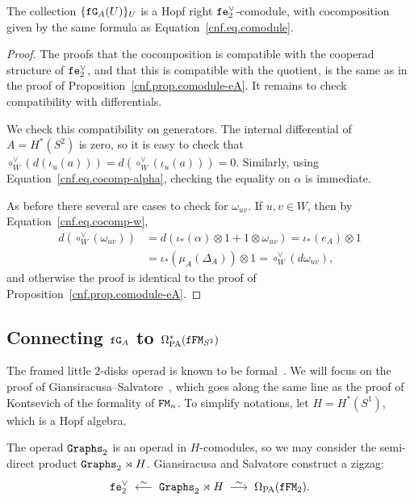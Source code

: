 \begin{proposition}
  \label{cnf.prop.fea-comod}
  The collection $\{ \ff\GG{A}(U) \}_{U}$ is a Hopf right $\ff\enV[2]$-comodule, with cocomposition given by the same formula as Equation~\eqref{cnf.eq.comodule}.
\end{proposition}

\begin{proof}
  The proofs that the cocomposition is compatible with the cooperad structure of $\ff\enV[2]$, and that this is compatible with the quotient, is the same as in the proof of Proposition~\ref{cnf.prop.comodule-eA}.
  It remains to check compatibility with differentials.

  We check this compatibility on generators.
  The internal differential of $A = H^{*}(S^{2})$ is zero, so it is easy to check that $\circ_{W}^{\vee}(d(\iota_{u}(a))) = d(\circ_{W}^{\vee}(\iota_{u}(a))) = 0$.
  Similarly, using Equation~\eqref{cnf.eq.cocomp-alpha}, checking the equality on $\alpha$ is immediate.

  As before there several are cases to check for $\omega_{uv}$.
  If $u,v \in W$, then by Equation~\eqref{cnf.eq.cocomp-w},
  \begin{align*}
    d(\circ_{W}^{\vee}(\omega_{uv}))
    & = d(\iota_{*}(\alpha) \otimes 1 + 1 \otimes \omega_{uv}) = \iota_{*}(e_{A}) \otimes 1 \\
    & = \iota_{*}(\mu_{A}(\Delta_{A})) \otimes 1 = \circ_{W}^{\vee}(d \omega_{uv}),
  \end{align*}
  and otherwise the proof is identical to the proof of Proposition~\ref{cnf.prop.comodule-eA}.
\end{proof}

\subsection{Connecting \texorpdfstring{$\ff\GG{A}$}{G\_A} to \texorpdfstring{$\OmPA^*(\ff\FM_{S^{2}})$}{Omega(fFM\_S2)}}
\label{cnf.sec.connecting-e_a-with}

The framed little $2$-disks operad is known to be formal~\cite{GiansiracusaSalvatore2010,Severa2010}.
We will focus on the proof of Giansiracusa--Salvatore~\cite{GiansiracusaSalvatore2010}, which goes along the same line as the proof of Kontsevich of the formality of $\FM_{n}$.
To simplify notations, let $H = H^{*}(S^{1})$, which is a Hopf algebra.

The operad $\Graphs_{2}$ is an operad in $H$-comodules, so we may consider the semi-direct product $\Graphs_{2} \rtimes H$.
Giansiracusa and Salvatore construct a zigzag:
\begin{equation}
  \label{cnf.eq:14}
  \ff\enV[2] \qiso* \Graphs_{2} \rtimes H \qiso \OmPA(\ff\FM_{2}).
\end{equation}


